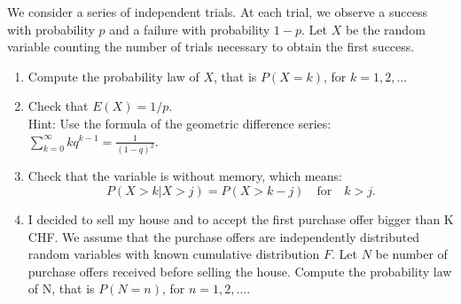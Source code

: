 \documentclass[12pt,thmsa]{article}
\begin{document}
We consider a series of independent trials. At each trial, we observe a success with probability $p$ and a failure with probability $1-p$. Let $X$ be the random variable counting the number of trials necessary to
obtain the first success.
\begin{enumerate}
  \item Compute the probability law of $X$, that is $P(X=k)$, for $k=1,2,..$.
  \item Check that $E(X)=1/p$. \\
  Hint: Use the formula of the geometric difference series: $\sum_{k=0}^\infty k q^{k-1}=\frac{1}{(1-q)^2}$.
  \item Check that the variable is without memory, which means:
  \begin{equation*}
    P(X>k\vert X>j)=P(X>k-j) \quad \text{for} \quad k>j.
  \end{equation*}
  \item I decided to sell my house and to accept the first purchase offer bigger than K CHF. We assume that the purchase offers are independently distributed random variables
  with known cumulative distribution $F$. Let $N$ be number of purchase offers received before selling the house.
  Compute the probability law of N, that is $P(N=n)$, for $n=1,2,...$.
\end{enumerate}
\end{document}
